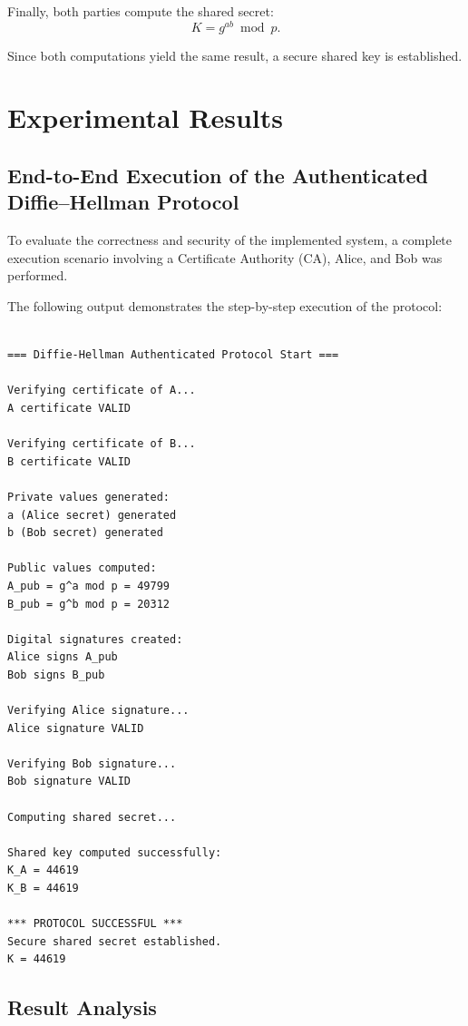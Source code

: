 \documentclass[12pt]{article}
\begin{document}
Finally, both parties compute the shared secret:
\[
K = g^{ab} \bmod p.
\]

Since both computations yield the same result, a secure shared key is established.

\newpage
\section{Experimental Results}

\subsection{End-to-End Execution of the Authenticated Diffie--Hellman Protocol}

To evaluate the correctness and security of the implemented system, a complete
execution scenario involving a Certificate Authority (CA), Alice, and Bob was performed.

The following output demonstrates the step-by-step execution of the protocol:

\begin{lstlisting}[style=console]

=== Diffie-Hellman Authenticated Protocol Start ===

Verifying certificate of A...
A certificate VALID

Verifying certificate of B...
B certificate VALID

Private values generated:
a (Alice secret) generated
b (Bob secret) generated

Public values computed:
A_pub = g^a mod p = 49799
B_pub = g^b mod p = 20312

Digital signatures created:
Alice signs A_pub
Bob signs B_pub

Verifying Alice signature...
Alice signature VALID

Verifying Bob signature...
Bob signature VALID

Computing shared secret...

Shared key computed successfully:
K_A = 44619
K_B = 44619

*** PROTOCOL SUCCESSFUL ***
Secure shared secret established.
K = 44619

\end{lstlisting}

\subsection{Result Analysis}
\end{document}

